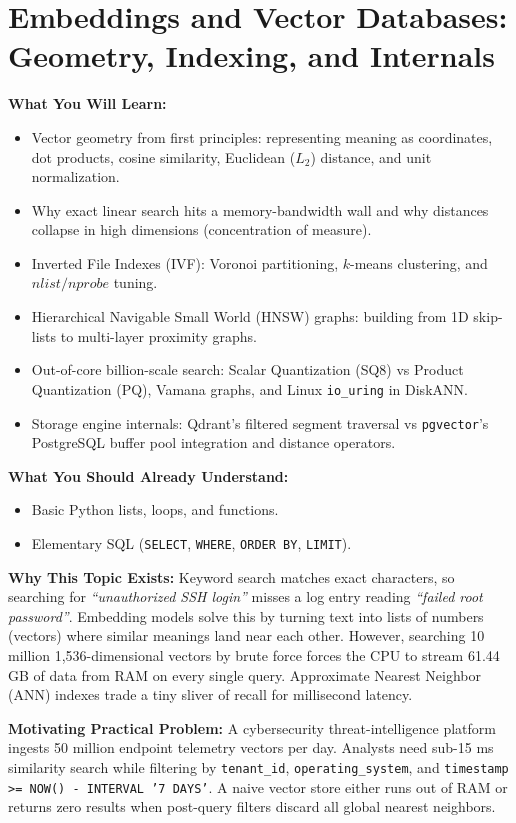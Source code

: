 \chapter{Embeddings and Vector Databases: Geometry, Indexing, and Internals}
\label{chap:embeddings}

\begin{chaptergoalsbox}
\textbf{What You Will Learn:}
\begin{itemize}[leftmargin=15pt]
  \item Vector geometry from first principles: representing meaning as coordinates, dot products, cosine similarity, Euclidean ($L_2$) distance, and unit normalization.
  \item Why exact linear search hits a memory-bandwidth wall and why distances collapse in high dimensions (concentration of measure).
  \item Inverted File Indexes (IVF): Voronoi partitioning, $k$-means clustering, and $nlist/nprobe$ tuning.
  \item Hierarchical Navigable Small World (HNSW) graphs: building from 1D skip-lists to multi-layer proximity graphs.
  \item Out-of-core billion-scale search: Scalar Quantization (SQ8) vs Product Quantization (PQ), Vamana graphs, and Linux \texttt{io\_uring} in DiskANN.
  \item Storage engine internals: Qdrant's filtered segment traversal vs \texttt{pgvector}'s PostgreSQL buffer pool integration and distance operators.
\end{itemize}

\textbf{What You Should Already Understand:}
\begin{itemize}[leftmargin=15pt]
  \item Basic Python lists, loops, and functions.
  \item Elementary SQL (\texttt{SELECT}, \texttt{WHERE}, \texttt{ORDER BY}, \texttt{LIMIT}).
\end{itemize}

\textbf{Why This Topic Exists:}
Keyword search matches exact characters, so searching for \emph{``unauthorized SSH login''} misses a log entry reading \emph{``failed root password''}. Embedding models solve this by turning text into lists of numbers (vectors) where similar meanings land near each other. However, searching 10 million 1,536-dimensional vectors by brute force forces the CPU to stream 61.44 GB of data from RAM on every single query. Approximate Nearest Neighbor (ANN) indexes trade a tiny sliver of recall for millisecond latency.

\textbf{Motivating Practical Problem:}
A cybersecurity threat-intelligence platform ingests 50 million endpoint telemetry vectors per day. Analysts need sub-15 ms similarity search while filtering by \texttt{tenant\_id}, \texttt{operating\_system}, and \texttt{timestamp >= NOW() - INTERVAL '7 DAYS'}. A naive vector store either runs out of RAM or returns zero results when post-query filters discard all global nearest neighbors.
\end{chaptergoalsbox}

